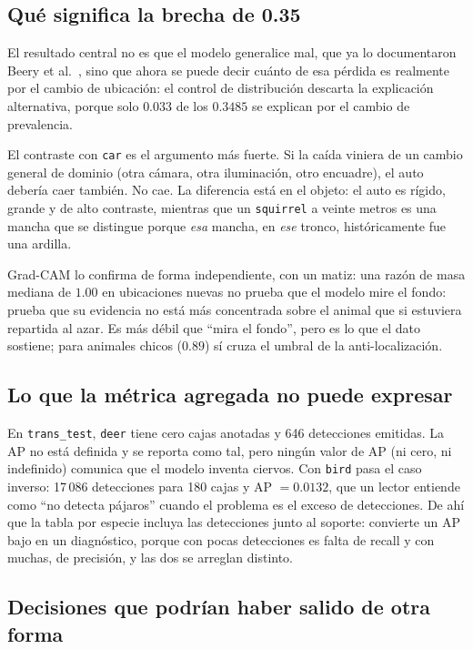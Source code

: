 \subsection{Qué significa la brecha de 0.35}

El resultado central no es que el modelo generalice mal, que ya lo documentaron
Beery et al.~\cite{beery2018recognition}, sino que ahora se puede decir cuánto
de esa pérdida es realmente por el cambio de ubicación: el control de
distribución descarta la explicación alternativa, porque solo $0.033$ de los
$0.3485$ se explican por el cambio de prevalencia.

El contraste con \texttt{car} es el argumento más fuerte. Si la caída viniera de
un cambio general de dominio (otra cámara, otra iluminación, otro encuadre), el
auto debería caer también. No cae. La diferencia está en el objeto: el auto es
rígido, grande y de alto contraste, mientras que un \texttt{squirrel} a veinte
metros es una mancha que se distingue porque \emph{esa} mancha, en \emph{ese}
tronco, históricamente fue una ardilla.

Grad-CAM lo confirma de forma independiente, con un matiz: una
razón de masa mediana de $1.00$ en ubicaciones nuevas no prueba que el modelo
mire el fondo: prueba que su evidencia no está más concentrada sobre el animal
que si estuviera repartida al azar. Es más débil que ``mira el fondo'', pero es
lo que el dato sostiene; para animales chicos ($0.89$) sí cruza el umbral de la
anti-localización.

\subsection{Lo que la métrica agregada no puede expresar}

En \texttt{trans\_test}, \texttt{deer} tiene cero cajas anotadas y 646
detecciones emitidas. La AP no está definida y
se reporta como tal, pero ningún valor de AP (ni cero, ni indefinido) comunica
que el modelo inventa ciervos. Con \texttt{bird} pasa el caso inverso: 17\,086
detecciones para 180 cajas y AP $= 0.0132$, que un lector entiende como ``no
detecta pájaros'' cuando el problema es el exceso de detecciones. De ahí que la
tabla por especie incluya las detecciones junto al soporte: convierte un AP bajo
en un diagnóstico, porque con pocas detecciones es falta de recall y con muchas,
de precisión, y las dos se arreglan distinto.

\subsection{Decisiones que podrían haber salido de otra forma}

